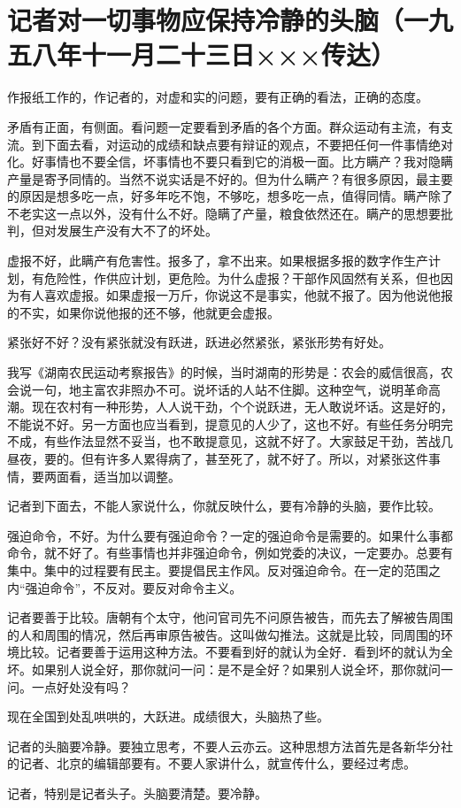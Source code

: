 \section[记者对一切事物应保持冷静的头脑（一九五八年十一月二十三日×××传达）]{记者对一切事物应保持冷静的头脑（一九五八年十一月二十三日×××传达）}


作报纸工作的，作记者的，对虚和实的问题，要有正确的看法，正确的态度。

矛盾有正面，有侧面。看问题一定要看到矛盾的各个方面。群众运动有主流，有支流。到下面去看，对运动的成绩和缺点要有辩证的观点，不要把任何一件事情绝对化。好事情也不要全信，坏事情也不要只看到它的消极一面。比方瞒产？我对隐瞒产量是寄予同情的。当然不说实话是不好的。但为什么瞒产？有很多原因，最主要的原因是想多吃一点，好多年吃不饱，不够吃，想多吃一点，值得同情。瞒产除了不老实这一点以外，没有什么不好。隐瞒了产量，粮食依然还在。瞒产的思想要批判，但对发展生产没有大不了的坏处。

虚报不好，此瞒产有危害性。报多了，拿不出来。如果根据多报的数字作生产计划，有危险性，作供应计划，更危险。为什么虚报？干部作风固然有关系，但也因为有人喜欢虚报。如果虚报一万斤，你说这不是事实，他就不报了。因为他说他报的不实，如果你说他报的还不够，他就更会虚报。

紧张好不好？没有紧张就没有跃进，跃进必然紧张，紧张形势有好处。

我写《湖南农民运动考察报告》的时候，当时湖南的形势是：农会的威信很高，农会说一句，地主富农非照办不可。说坏话的人站不住脚。这种空气，说明革命高潮。现在农村有一种形势，人人说干劲，个个说跃进，无人敢说坏话。这是好的，不能说不好。另一方面也应当看到，提意见的人少了，这也不好。有些任务分明完不成，有些作法显然不妥当，也不敢提意见，这就不好了。大家鼓足干劲，苦战几昼夜，要的。但有许多人累得病了，甚至死了，就不好了。所以，对紧张这件事情，要两面看，适当加以调整。

记者到下面去，不能人家说什么，你就反映什么，要有冷静的头脑，要作比较。

强迫命令，不好。为什么要有强迫命令？一定的强迫命令是需要的。如果什么事都命令，就不好了。有些事情也并非强迫命令，例如党委的决议，一定要办。总要有集中。集中的过程要有民主。要提倡民主作风。反对强迫命令。在一定的范围之内“强迫命令”，不反对。要反对命令主义。

记者要善于比较。唐朝有个太守，他问官司先不问原告被告，而先去了解被告周围的人和周围的情况，然后再审原告被告。这叫做勾推法。这就是比较，同周围的环境比较。记者要善于运用这种方法。不要看到好的就认为全好．看到坏的就认为全坏。如果别人说全好，那你就问一问：是不是全好？如果别人说全坏，那你就问一问。一点好处没有吗？

现在全国到处乱哄哄的，大跃进。成绩很大，头脑热了些。

记者的头脑要冷静。要独立思考，不要人云亦云。这种思想方法首先是各新华分社的记者、北京的编辑部要有。不要人家讲什么，就宣传什么，要经过考虑。

记者，特别是记者头子。头脑要清楚。要冷静。


